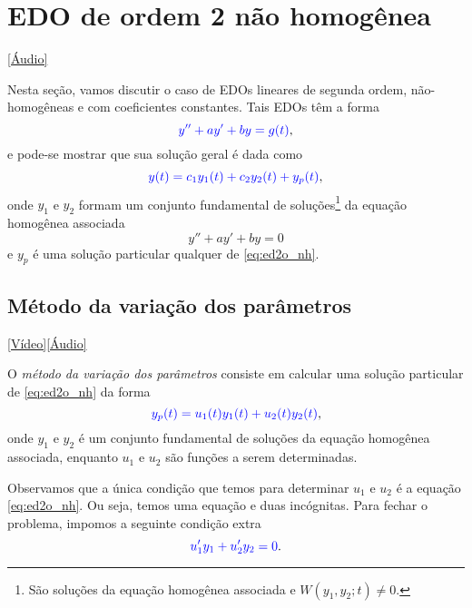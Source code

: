 \section{EDO de ordem 2 não homogênea}\label{cap_edolin_sec_edo2III}

\begin{flushright}
  [Vídeo]\href{https://archive.org/details/s-3-3-edo-ordem-2-nao-homogenea}{[Áudio]}
\end{flushright}

Nesta seção, vamos discutir o caso de EDOs lineares de segunda ordem, não-homogêneas e com coeficientes constantes. Tais EDOs têm a forma
\begin{equation}\label{eq:ed2o_nh}
  {\color{blue}y'' + ay' + by = g(t)},
\end{equation}
e pode-se mostrar que sua solução geral é dada como
\begin{equation}
  {\color{blue}y(t) = c_1y_1(t) + c_2y_2(t) + y_p(t)},
\end{equation}
onde $y_1$ e $y_2$ formam um conjunto fundamental de soluções\footnote{São soluções da equação homogênea associada e $W(y_1,y_2;t)\neq 0$.} da equação homogênea associada
\begin{equation}
  y'' + ay' + by = 0
\end{equation}
e $y_p$ é uma solução particular qualquer de \eqref{eq:ed2o_nh}.

\subsection{Método da variação dos parâmetros}

\begin{flushright}
  \href{https://archive.org/details/edo-ordem-2-mvp}{[Vídeo]}\href{https://archive.org/details/ss-3-3-1-metodo-da-variacao-dos-parametros}{[Áudio]}
\end{flushright}

O \emph{método da variação dos parâmetros} consiste em calcular uma solução particular de \eqref{eq:ed2o_nh} da forma
\begin{equation}
  {\color{blue}y_p(t) = u_1(t)y_1(t) + u_2(t)y_2(t)},
\end{equation}
onde $y_1$ e $y_2$ é um conjunto fundamental de soluções da equação homogênea associada, enquanto $u_1$ e $u_2$ são funções a serem determinadas.

Observamos que a única condição que temos para determinar $u_1$ e $u_2$ é a equação \eqref{eq:ed2o_nh}. Ou seja, temos uma equação e duas incógnitas. Para fechar o problema, impomos a seguinte condição extra
\begin{equation}\label{eq:ed2o_nh_mv_1}
  {\color{blue}u_1'y_1 + u_2'y_2 = 0}.
\end{equation}

